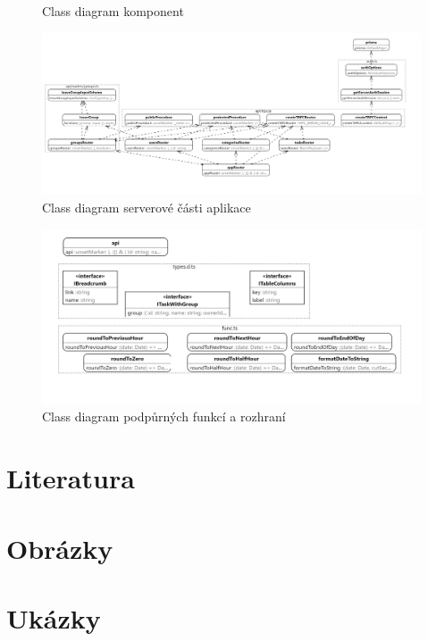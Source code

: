 \documentclass[a4paper,12pt]{report}
\begin{document}
\begin{landscape}
\begin{figure}[hbt!]
	\caption{Class diagram komponent}
\end{figure}
\pagebreak
\begin{figure}[hbt!]
	\centering
	\includegraphics[width=1\linewidth]{img/ClassDiagramy/server_diagram.png}
	\caption{Class diagram serverové části aplikace}
\end{figure}
\begin{figure}[hbt!]
	\centering
	\includegraphics[width=1\linewidth]{img/ClassDiagramy/utils_diagram.png}
	\caption{Class diagram podpůrných funkcí a rozhraní}
\end{figure}

\pagebreak
\end{landscape}
\let\clearpage\relax
\section{Literatura}
\printbibliography[heading=none]
\pagebreak
\section{Obrázky}
\vspace{-64pt}
\listoffigures
\pagebreak
\section{Ukázky}
\vspace{-48pt}
\lstlistoflistings

\pagebreak
\end{document}
